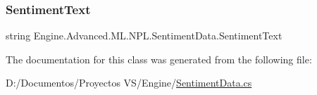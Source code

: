 \mbox{\label{class_engine_1_1_advanced_1_1_m_l_1_1_n_p_l_1_1_sentiment_data_a808f18bb74cca7b54746fbd4f3c329fd}} 
\subsubsection{\texorpdfstring{SentimentText}{SentimentText}}
{\footnotesize\ttfamily string Engine.\+Advanced.\+M\+L.\+N\+P\+L.\+Sentiment\+Data.\+Sentiment\+Text}



The documentation for this class was generated from the following file\+:\begin{DoxyCompactItemize}
\item 
D\+:/\+Documentos/\+Proyectos V\+S/\+Engine/\mbox{\hyperlink{_sentiment_data_8cs}{Sentiment\+Data.\+cs}}\end{DoxyCompactItemize}

